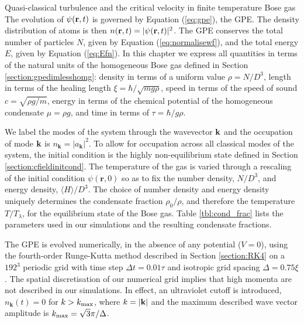 \begin{chapter}{\label{cha:nonequib}Quasi-classical turbulence and the critical velocity in finite temperature Bose gas}
The evolution of $\psi({\bf r},t)$ is governed by Equation (\ref{eq:gpe}), the GPE. The density distribution of atoms is then $n({\bf r},t)=|\psi({\bf r},t)|^2$.
The GPE conserves the total number of particles $N$, given by Equation (\ref{eq:normalisewf}), and the total energy $E$, given by Equation (\ref{eq:Efn}). In this chapter we express all quantities in terms of the natural units of the homogeneous Bose gas defined in Section \ref{section:gpedimlesshomg}:  density in terms of a uniform value $\rho = N/D^3$, length in terms of the healing length $\xi=\hbar/\sqrt{m g \rho}$, speed in terms of the speed of sound $c=\sqrt{\rho g/m}$, energy in terms of the chemical potential of the homogeneous condensate $\mu=\rho g$, and time in terms of $\tau=\hbar / g \rho$.

We label the modes of the system through the wavevector ${\bf k}$ and the occupation of mode ${\bf k}$ is $n_{\mathbf{k}}=|a_{\mathbf{k}}|^2$. To allow for occupation across all classical modes of the system, the initial condition is the highly non-equilibrium state defined in Section \ref{section:cfieldinitcond}.  The temperature of the gas is varied through a rescaling of the initial condition $\psi(\mathbf{r},0)$ so as to fix the number density, $N/D^3$, and energy density, $\langle H \rangle/D^3$. The choice of number density and energy density uniquely determines the condensate fraction $\rho_0/\rho$, and therefore the temperature $T/T_\lambda$, for the equilibrium state of the Bose gas. Table \ref{tbl:cond_frac} lists the parameters used in our simulations and the resulting condensate fractions.

The GPE is evolved numerically, in the absence of any potential ($V = 0$), using the fourth-order Runge-Kutta method described in Section \ref{section:RK4} on a $192^3$ periodic grid with time step $\Delta t =0.01 \tau$ and isotropic grid spacing $\Delta =0.75\xi$. The spatial discretisation of our numerical grid implies that high momenta are not described in our simulations. In effect, an ultraviolet cutoff is introduced, $n_{\mathbf{k}}(t)=0$ for $k>k_{\rm{max}}$, where $k=|{\bf k}|$ and the maximum described wave vector amplitude is $k_{\rm{max}} = \sqrt{3} \pi / \Delta$. 


\end{chapter}
